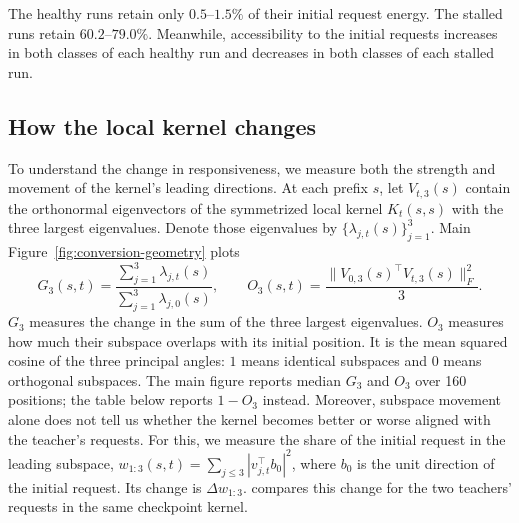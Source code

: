 The healthy runs retain only $0.5$--$1.5\%$ of their initial request energy. The stalled runs retain $60.2$--$79.0\%$. Meanwhile, accessibility to the initial requests increases in both classes of each healthy run and decreases in both classes of each stalled run.

\FloatBarrier
{}
\subsection{How the local kernel changes}
\label{app:collective-geometry}
To understand the change in responsiveness, we measure both the strength and movement of the kernel's leading directions. At each prefix $s$, let $V_{t,3}(s)$ contain the orthonormal eigenvectors of the symmetrized local kernel $K_t(s,s)$ with the three largest eigenvalues. Denote those eigenvalues by $\{\lambda_{j,t}(s)\}_{j=1}^3$. Main Figure~\ref{fig:conversion-geometry} plots
\[
 G_3(s,t)=\frac{\sum_{j=1}^3\lambda_{j,t}(s)}{\sum_{j=1}^3\lambda_{j,0}(s)},
 \qquad
 O_3(s,t)=\frac{\|V_{0,3}(s)^\top V_{t,3}(s)\|_F^2}{3}.
\]
$G_3$ measures the change in the sum of the three largest eigenvalues. $O_3$ measures how much their subspace overlaps with its initial position. It is the mean squared cosine of the three principal angles: $1$ means identical subspaces and $0$ means orthogonal subspaces. The main figure reports median $G_3$ and $O_3$ over 160 positions; the table below reports $1-O_3$ instead. Moreover, subspace movement alone does not tell us whether the kernel becomes better or worse aligned with the teacher's requests. For this, we measure the share of the initial request in the leading subspace, $w_{1:3}(s,t)=\sum_{j\leq3}|v_{j,t}^\top b_0|^2$, where $b_0$ is the unit direction of the initial request. Its change is $\Delta w_{1:3}$.  compares this change for the two teachers' requests in the same checkpoint kernel.

\begin{table}[htb]
\centering\small\setlength{\tabcolsep}{3.4pt}

\caption{\textbf{Changes in local geometry.} Except in the last column, ratios and differences are computed at each position before taking the median. The last column compares accessibility averaged across positions with weights proportional to initial request energy. The median and weighted average describe different aspects of the same sample. Here pp denotes percentage points.}
\label{tab:collective-geometry}
\end{table}

